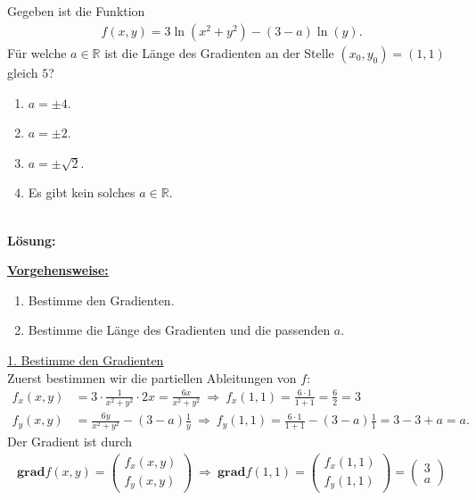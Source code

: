 \subsection*{}
Gegeben ist die Funktion
\begin{align*}
f(x,y) = 3 \ln(x^2 + y^2) - (3-a) \ln(y).
\end{align*}
Für welche $ a \in \mathbb{R} $ ist die Länge des Gradienten an der Stelle  $ (x_0,y_0) = (1,1) $ gleich $ 5 $?
\renewcommand{\labelenumi}{(\alph{enumi})}
\begin{enumerate}
	\item 
	$ a = \pm 4 $.
	\item
	$ a = \pm 2 $.
	\item
	$ a = \pm \sqrt{2} $.
	\item
	Es gibt kein solches $ a \in \mathbb{R} $.
\end{enumerate}
\ \\
\textbf{Lösung:}
\begin{mdframed}
\underline{\textbf{Vorgehensweise:}}
\renewcommand{\labelenumi}{\theenumi.}
\begin{enumerate}
\item Bestimme den Gradienten.
\item Bestimme die Länge des Gradienten und die passenden $ a $.
\end{enumerate}
\end{mdframed}
\underline{1. Bestimme den Gradienten}\\
Zuerst bestimmen wir die partiellen Ableitungen von $ f $:
\begin{align*}
f_x(x,y) &= 3 \cdot \frac{1}{x^2 + y^2} \cdot  2 x = \frac{6x}{x^2 + y^2} 
\ \Rightarrow \
f_x(1,1) = \frac{6 \cdot 1}{1+1} = \frac{6}{2} = 3
\\
f_y(x,y) &= \frac{6y}{x^2 + y^2} - (3-a) \frac{1}{y}
\ \Rightarrow \
f_y(1,1)
= \frac{6 \cdot 1}{1 + 1}- (3-a) \frac{1}{1}
=
3-3 + a = a
.
\end{align*}
Der Gradient ist durch
\begin{align*}
\textbf{grad} f(x,y) = 
\begin{pmatrix}
f_x(x,y)\\
f_y(x,y)
\end{pmatrix}
\ \Rightarrow \
\textbf{grad} f(1,1) = 
\begin{pmatrix}
f_x(1,1)\\
f_y(1,1)
\end{pmatrix}
= 
\begin{pmatrix}
3 \\ a
\end{pmatrix}
\end{align*}

